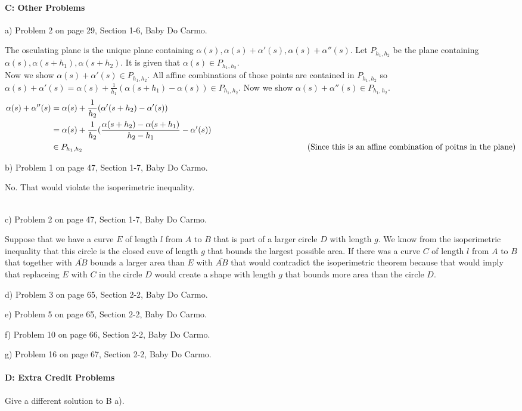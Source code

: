 \documentclass[12pt,letterpaper,boxed]{hmcpset}
\newcommand{\cmmt}[1]{%
  \text{\phantom{(#1)}} \tag{#1}
}
\begin{document}
\paragraph{C: Other Problems}
\begin{itemize}
{\item a) Problem 2 on page 29, Section 1-6, Baby Do Carmo.}
\begin{solution}
  The osculating plane is the unique plane containing $\alpha(s), \alpha(s) + \alpha'(s), \alpha(s)
  + \alpha''(s)$. Let $P_{h_1, h_2}$ be the plane containing $\alpha(s), \alpha(s + h_1), \alpha(s +
  h_2)$.  It is given that $\alpha(s) \in P_{h_1, h_2}$.\\
  Now we show $\alpha(s) + \alpha'(s) \in P_{h_1, h_2}$. All affine combinations of those points are contained in $P_{h_1, h_2}$ so
  $\alpha(s) + \alpha'(s) = \alpha(s) + \frac{1}{h_1}(\alpha(s + h_1) - \alpha(s)) \in P_{h_1, h_2}$. 
  Now we show $\alpha(s) + \alpha''(s) \in P_{h_1, h_2}$.
  \begin{align*}
    \alpha(s) + \alpha''(s) &= \alpha(s) + \frac{1}{h_2}(\alpha'(s + h_2) - \alpha'(s)) \\
                  &= \alpha(s) + \frac{1}{h_2}(\frac{\alpha(s + h_2) - \alpha(s + h_1)}{h_2 - h_1} - \alpha'(s)) \\
                  &\in P_{h_1, h_2} \cmmt{Since this is an affine combination of poitns in the plane} \\
  \end{align*}
\end{solution}
{\item b) Problem 1 on page 47, Section 1-7, Baby Do Carmo.}
\begin{solution}
  No. That would violate the isoperimetric inequality. \\\\
\end{solution}
{\item c) Problem 2 on page 47, Section 1-7, Baby Do Carmo.}
\begin{solution}
Suppose that we have a curve $E$ of length $l$ from $A$ to $B$ that is part of a larger circle $D$ with length $g$. We know from the isoperimetric
inequality that this circle is the closed cuve of length $g$ that bounds the
largest possible area. If there was a curve $C$ of length $l$ from $A$ to $B$ that together
with $\overline{AB}$ bounds a larger area than $E$ with $\overline{AB}$ that would
contradict the isoperimetric theorem because that would imply that replaceing
$E$ with $C$ in the circle $D$ would create a shape with length $g$ that bounds
more area than the circle $D$.
\end{solution}
{\item d) Problem 3 on page 65, Section 2-2, Baby Do Carmo.}
{\item e) Problem 5 on page 65, Section 2-2, Baby Do Carmo.}
{\item f) Problem 10 on page 66, Section 2-2, Baby Do Carmo.}
{\item g) Problem 16 on page 67, Section 2-2, Baby Do Carmo.}

\end{itemize}

\paragraph{D: Extra Credit Problems}
\begin{itemize}
{\item Give a different solution to B a).}
\end{itemize}
\end{document}

